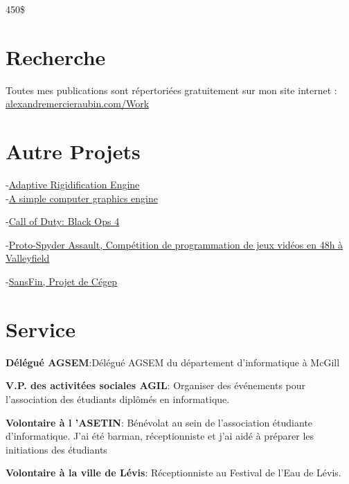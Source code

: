 \documentclass[10pt]{article} %
\begin{document}
{
\textit{} 450\$\\
}

\section{Recherche}
Toutes mes publications sont répertoriées gratuitement sur mon site internet : \href{https://alexandremercieraubin.com/Work}{alexandremercieraubin.com/Work}


\section{Autre Projets}

{
-\href{https://github.com/AlexandreMercierAubin/AdaptiveRigidification2022}{Adaptive Rigidification Engine}\\
-\href{https://github.com/AlexandreMercierAubin/ComputerGraphics}{A simple computer graphics engine}\\

}

{
-\href{https://www.callofduty.com/ca/en/blackops4}{Call of Duty: Black Ops 4}

-\href{https://youtu.be/qJjy8b0kuSY}{Proto-Spyder Assault, Compétition de programmation de jeux vidéos en 48h à Valleyfield}

-\href{https://youtu.be/s6vr07Nt1IY}{SansFin, Projet de Cégep}
}

\section{Service}
\textbf{Délégué AGSEM}:Délégué AGSEM du département d'informatique à McGill

\textbf{V.P. des activitées sociales AGIL}: Organiser des événements pour l'association des étudiants diplômés en informatique.

\textbf{Volontaire à l 'ASETIN}: Bénévolat au sein de l'association étudiante d'informatique. J'ai été barman, réceptionniste et j'ai
aidé à préparer les initiations des étudiants

\textbf{Volontaire à la ville de Lévis}: Réceptionniste au Festival de l'Eau de Lévis.
\end{document}
